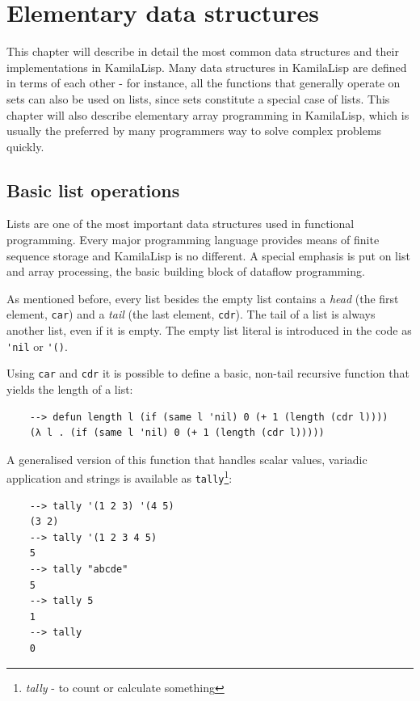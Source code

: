 
\chapter{Elementary data structures}

This chapter will describe in detail the most common data structures and their implementations in KamilaLisp. Many data structures in KamilaLisp are defined in terms of each other - for instance, all the functions that generally operate on sets can also be used on lists, since sets constitute a special case of lists. This chapter will also describe elementary array programming in KamilaLisp, which is usually the preferred by many programmers way to solve complex problems quickly.

\section{Basic list operations}

Lists are one of the most important data structures used in functional programming. Every major programming language provides means of finite sequence storage and KamilaLisp is no different. A special emphasis is put on list and array processing, the basic building block of dataflow programming.

As mentioned before, every list besides the empty list contains a \textit{head} (the first element, \verb|car|) and a \textit{tail} (the last element, \verb|cdr|). The tail of a list is always another list, even if it is empty. The empty list literal is introduced in the code as \verb|'nil| or \verb|'()|. 

Using \verb|car| and \verb|cdr| it is possible to define a basic, non-tail recursive function that yields the length of a list:

\begin{Verbatim}
    --> defun length l (if (same l 'nil) 0 (+ 1 (length (cdr l))))
    (λ l . (if (same l 'nil) 0 (+ 1 (length (cdr l)))))
\end{Verbatim}

A generalised version of this function that handles scalar values, variadic application and strings is available as \verb|tally|\footnote{\textit{tally} - to count or calculate something}:

\begin{Verbatim}
    --> tally '(1 2 3) '(4 5)
    (3 2)
    --> tally '(1 2 3 4 5)
    5
    --> tally "abcde"
    5
    --> tally 5
    1
    --> tally
    0
\end{Verbatim}

